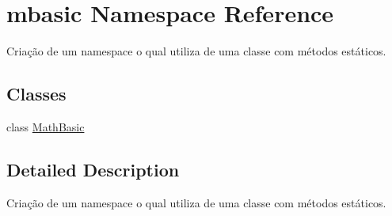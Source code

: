 \hypertarget{namespacembasic}{\section{mbasic Namespace Reference}
\label{namespacembasic}
}


Criação de um namespace o qual utiliza de uma classe com métodos estáticos.  


\subsection*{Classes}
\begin{DoxyCompactItemize}
\item 
class \hyperlink{classmbasic_1_1MathBasic}{Math\-Basic}
\end{DoxyCompactItemize}


\subsection{Detailed Description}
Criação de um namespace o qual utiliza de uma classe com métodos estáticos. 